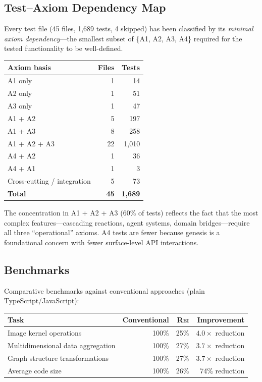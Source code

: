 \documentclass[11pt,a4paper]{article}
\newcommand{\Rei}{\textsc{Rei}}
\begin{document}
\subsection{Test--Axiom Dependency Map}

Every test file (45 files, 1,689 tests, 4 skipped) has been classified by its \emph{minimal axiom dependency}---the smallest subset of \{A1, A2, A3, A4\} required for the tested functionality to be well-defined.

\begin{center}
\begin{tabular}{@{}lrr@{}}
\toprule
Axiom basis & Files & Tests \\
\midrule
A1 only & 1 & 14 \\
A2 only & 1 & 51 \\
A3 only & 1 & 47 \\
A1 + A2 & 5 & 197 \\
A1 + A3 & 8 & 258 \\
A1 + A2 + A3 & 22 & 1,010 \\
A4 + A2 & 1 & 36 \\
A4 + A1 & 1 & 3 \\
Cross-cutting / integration & 5 & 73 \\
\midrule
\textbf{Total} & \textbf{45} & \textbf{1,689} \\
\bottomrule
\end{tabular}
\end{center}

\noindent The concentration in A1 + A2 + A3 (60\% of tests) reflects the fact that the most complex features---cascading reactions, agent systems, domain bridges---require all three ``operational'' axioms. A4 tests are fewer because genesis is a foundational concern with fewer surface-level API interactions.

\subsection{Benchmarks}

Comparative benchmarks against conventional approaches (plain TypeScript/JavaScript):

\begin{center}
\begin{tabular}{@{}lrrr@{}}
\toprule
Task & Conventional & \Rei{} & Improvement \\
\midrule
Image kernel operations & 100\% & 25\% & $4.0\times$ reduction \\
Multidimensional data aggregation & 100\% & 27\% & $3.7\times$ reduction \\
Graph structure transformations & 100\% & 27\% & $3.7\times$ reduction \\
Average code size & 100\% & 26\% & 74\% reduction \\
\bottomrule
\end{tabular}
\end{center}
\end{document}
